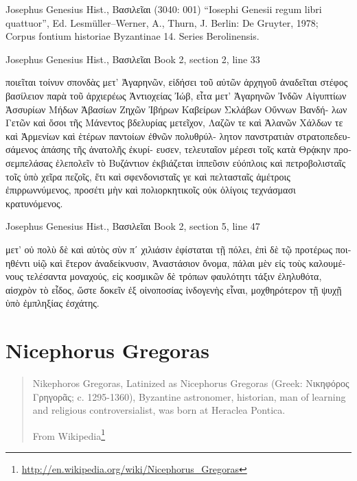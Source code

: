\documentclass[12pt,letterpaper,twoside,final]{memoir}
\begin{document}
\begin{greek}

Josephus Genesius Hist., Βασιλεῖαι (3040: 001)
“Iosephi Genesii regum libri quattuor”, Ed. Lesmüller–Werner, A., Thurn, J.
Berlin: De Gruyter, 1978; Corpus fontium historiae Byzantinae 14. Series Berolinensis.



Josephus Genesius Hist., Βασιλεῖαι 
Book 2, section 2, line 33

              ποιεῖται τοίνυν σπονδὰς μετ' Ἀγαρηνῶν, εἰδήσει τοῦ 
αὐτῶν ἀρχηγοῦ ἀναδεῖται στέφος βασίλειον παρὰ τοῦ ἀρχιερέως 
Ἀντιοχείας Ἰώβ, εἶτα μετ' Ἀγαρηνῶν Ἰνδῶν Αἰγυπτίων Ἀσσυρίων 
Μήδων Ἀβασίων Ζηχῶν Ἰβήρων Καβείρων Σκλάβων Οὔννων Βανδή-
λων Γετῶν καὶ ὅσοι τῆς Μάνεντος βδελυρίας μετεῖχον, Λαζῶν τε καὶ 
Ἀλανῶν Χάλδων τε καὶ Ἀρμενίων καὶ ἑτέρων παντοίων ἐθνῶν πολυθρύλ-
λητον πανστρατιὰν στρατοπεδευσάμενος ἁπάσης τῆς ἀνατολῆς ἐκυρί-
ευσεν, τελευταῖον μέρεσι τοῖς κατὰ Θρᾴκην προσεμπελάσας ἑλεπολεῖν 
τὸ Βυζάντιον ἐκβιάζεται ἱππεῦσιν εὐόπλοις καὶ πετροβολισταῖς τοῖς 
ὑπὸ χεῖρα πεζοῖς, ἔτι καὶ σφενδονισταῖς γε καὶ πελτασταῖς ἀμέτροις 
ἐπιρρωννύμενος, προσέτι μὴν καὶ πολιορκητικοῖς οὐκ ὀλίγοις τεχνάσμασι 
κρατυνόμενος. 


Josephus Genesius Hist., Βασιλεῖαι 
Book 2, section 5, line 47

                  μετ' οὐ πολὺ δὲ καὶ αὐτὸς σὺν πʹ χιλιάσιν ἐφίσταται 
τῇ πόλει, ἐπὶ δὲ τῷ προτέρως ποιηθέντι υἱῷ καὶ ἕτερον ἀναδείκνυσιν, 
Ἀναστάσιον ὄνομα, πάλαι μὲν εἰς τοὺς καλουμένους τελέσαντα μοναχούς, 
εἰς κοσμικῶν δὲ τρόπων φαυλότητι τάξιν ἐληλυθότα, αἰσχρὸν τὸ εἶδος, 
ὥστε δοκεῖν ἐξ οἰνοποσίας ἰνδογενὴς εἶναι, μοχθηρότερον τῇ ψυχῇ 
ὑπὸ ἐμπληξίας ἐσχάτης. 

\end{greek}



\section{Nicephorus Gregoras}
\blockquote[From Wikipedia\footnote{\url{http://en.wikipedia.org/wiki/Nicephorus_Gregoras}}]{Nikephoros Gregoras, Latinized as Nicephorus Gregoras (Greek: Νικηφόρος Γρηγορᾶς; c. 1295-1360), Byzantine astronomer, historian, man of learning and religious controversialist, was born at Heraclea Pontica.}
\end{document}

